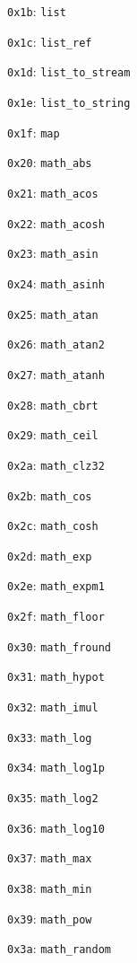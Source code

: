 \begin{tightlist}
  \texttt{0x1b}: \texttt{list}
\item
  \texttt{0x1c}: \texttt{list\_ref}
\item
  \texttt{0x1d}: \texttt{list\_to\_stream}
\item
  \texttt{0x1e}: \texttt{list\_to\_string}
\item
  \texttt{0x1f}: \texttt{map}
\item
  \texttt{0x20}: \texttt{math\_abs}
\item
  \texttt{0x21}: \texttt{math\_acos}
\item
  \texttt{0x22}: \texttt{math\_acosh}
\item
  \texttt{0x23}: \texttt{math\_asin}
\item
  \texttt{0x24}: \texttt{math\_asinh}
\item
  \texttt{0x25}: \texttt{math\_atan}
\item
  \texttt{0x26}: \texttt{math\_atan2}
\item
  \texttt{0x27}: \texttt{math\_atanh}
\item
  \texttt{0x28}: \texttt{math\_cbrt}
\item
  \texttt{0x29}: \texttt{math\_ceil}
\item
  \texttt{0x2a}: \texttt{math\_clz32}
\item
  \texttt{0x2b}: \texttt{math\_cos}
\item
  \texttt{0x2c}: \texttt{math\_cosh}
\item
  \texttt{0x2d}: \texttt{math\_exp}
\item
  \texttt{0x2e}: \texttt{math\_expm1}
\item
  \texttt{0x2f}: \texttt{math\_floor}
\item
  \texttt{0x30}: \texttt{math\_fround}
\item
  \texttt{0x31}: \texttt{math\_hypot}
\item
  \texttt{0x32}: \texttt{math\_imul}
\item
  \texttt{0x33}: \texttt{math\_log}
\item
  \texttt{0x34}: \texttt{math\_log1p}
\item
  \texttt{0x35}: \texttt{math\_log2}
\item
  \texttt{0x36}: \texttt{math\_log10}
\item
  \texttt{0x37}: \texttt{math\_max}
\item
  \texttt{0x38}: \texttt{math\_min}
\item
  \texttt{0x39}: \texttt{math\_pow}
\item
  \texttt{0x3a}: \texttt{math\_random}

\end{tightlist}
